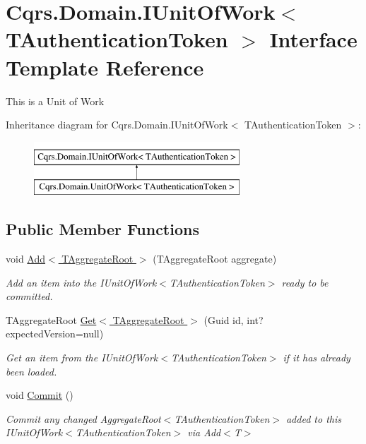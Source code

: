 \hypertarget{interfaceCqrs_1_1Domain_1_1IUnitOfWork}{}\section{Cqrs.\+Domain.\+I\+Unit\+Of\+Work$<$ T\+Authentication\+Token $>$ Interface Template Reference}
\label{interfaceCqrs_1_1Domain_1_1IUnitOfWork}


This is a Unit of Work  


Inheritance diagram for Cqrs.\+Domain.\+I\+Unit\+Of\+Work$<$ T\+Authentication\+Token $>$\+:\begin{figure}[H]
\begin{center}
\leavevmode
\includegraphics[height=2.000000cm]{interfaceCqrs_1_1Domain_1_1IUnitOfWork}
\end{center}
\end{figure}
\subsection*{Public Member Functions}
\begin{DoxyCompactItemize}
\item 
void \hyperlink{interfaceCqrs_1_1Domain_1_1IUnitOfWork_a786ebca85b4ef7294b98280230ef1397_a786ebca85b4ef7294b98280230ef1397}{Add$<$ T\+Aggregate\+Root $>$} (T\+Aggregate\+Root aggregate)
\begin{DoxyCompactList}\small\item\em Add an item into the I\+Unit\+Of\+Work$<$\+T\+Authentication\+Token$>$ ready to be committed. \end{DoxyCompactList}\item 
T\+Aggregate\+Root \hyperlink{interfaceCqrs_1_1Domain_1_1IUnitOfWork_aad3e9f94cbe6941163feb9fe00ddbe06_aad3e9f94cbe6941163feb9fe00ddbe06}{Get$<$ T\+Aggregate\+Root $>$} (Guid id, int? expected\+Version=null)
\begin{DoxyCompactList}\small\item\em Get an item from the I\+Unit\+Of\+Work$<$\+T\+Authentication\+Token$>$ if it has already been loaded. \end{DoxyCompactList}\item 
void \hyperlink{interfaceCqrs_1_1Domain_1_1IUnitOfWork_ade600c9bf9e8380c24eaf1e7e0df6e01_ade600c9bf9e8380c24eaf1e7e0df6e01}{Commit} ()
\begin{DoxyCompactList}\small\item\em Commit any changed Aggregate\+Root$<$\+T\+Authentication\+Token$>$ added to this I\+Unit\+Of\+Work$<$\+T\+Authentication\+Token$>$ via Add$<$\+T$>$ \end{DoxyCompactList}\end{DoxyCompactItemize}


